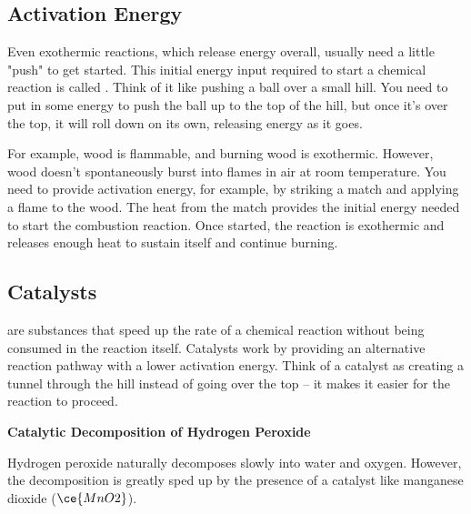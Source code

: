 {\subsection{Activation Energy}


Even exothermic reactions, which release energy overall, usually need a little "push" to get started. This initial energy input required to start a chemical reaction is called . Think of it like pushing a ball over a small hill. You need to put in some energy to push the ball up to the top of the hill, but once it's over the top, it will roll down on its own, releasing energy as it goes.

For example, wood is flammable, and burning wood is exothermic. However, wood doesn't spontaneously burst into flames in air at room temperature. You need to provide activation energy, for example, by striking a match and applying a flame to the wood. The heat from the match provides the initial energy needed to start the combustion reaction. Once started, the reaction is exothermic and releases enough heat to sustain itself and continue burning.

\subsection{Catalysts}


 are substances that speed up the rate of a chemical reaction without being consumed in the reaction itself. Catalysts work by providing an alternative reaction pathway with a lower activation energy.  Think of a catalyst as creating a tunnel through the hill instead of going over the top – it makes it easier for the reaction to proceed.

\begin{example}
\textbf{Catalytic Decomposition of Hydrogen Peroxide}

Hydrogen peroxide naturally decomposes slowly into water and oxygen.  However, the decomposition is greatly sped up by the presence of a catalyst like manganese dioxide ($\ce{MnO2}$).


\end{example}}
